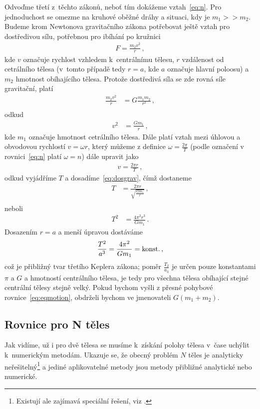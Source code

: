 \documentclass[A4paper, 12pt, oneside]{book}
\begin{document}
Odvoďme třetí z~těchto zákonů, neboť tím dokážeme vztah~\eqref{eq:n}. Pro jednoduchost se omezme na kruhové oběžné dráhy a situaci, kdy je $m_1>>m_2$. Budeme krom Newtonova gravitačního zákona potřebovat ještě vztah pro dostředivou sílu, potřebnou pro ibíhání po kružnici
\begin{align}
	F=\frac{m_2v^2}{r}\,,
\end{align}
kde $v$ označuje rychlost vzhledem k~centrálnímu tělesu, $r$ vzdálenost od cetrálního tělesa (v~tomto případě tedy $r=a$, kde $a$ označuje hlavní poloosu) a $m_2$ hmotnost obíhajícího tělesa. Protože dostředivá síla se zde rovná síle gravitační, platí
\begin{align}
	\nonumber \frac{m_2v^2}{r}&=G\frac{m_1m_2}{r^2}\,, \\
\end{align}
	odkud
\begin{align}
	v^2&=\frac{Gm_1}{r}\,, \label{eq:dosgrav}
\end{align}
kde $m_1$ označuje hmotnost cetrálního tělesa. Dále platí vztah mezi úhlovou a obvodovou rychlostí $v=\omega r$, který můžeme z definice $\omega=\frac{2\pi}{T}$ (podle označení v rovnici~\eqref{eq:n} platí $\omega=n$) dále upravit jako
\begin{align}
	v=\frac{2\pi r}{T}\,,
\end{align}
odkud vyjádříme $T$ a dosadíme~\eqref{eq:dosgrav}, čímž dostaneme
\begin{align}
	T&=\frac{2\pi r}{\sqrt{\frac{Gm_1}{r}}}\,, \\
	\end{align}
	neboli
	\begin{align}
	T^2&=\frac{4\pi^2 r^3}{Gm_1}\,.
\end{align}
Dosazením $r=a$ a menší úpravou dostáváme
\begin{align*}
	\frac{T^2}{a^3}=\frac{4\pi^2}{Gm_1}={\rm konst.}\,,
\end{align*}
což je přibližný tvar třetího Keplera zákona; poměr $\frac{T_2}{a_3}$ je určen pouze konstantami $\pi$ a $G$ a hmotností centrálního tělesa, je tedy pro všechna tělesa obíhající stejné centrální tělesy stejně velký. Pokud bychom vyšli z přesné pohybové rovnice~\ref{eq:eqmotion}, obdrželi bychom ve jmenovateli $G(m_1+m_2)$. 


\subsection{Rovnice pro N těles}
Jak vidíme, už i pro dvě tělesa se musíme k~získání polohy tělesa v~čase uchýlit k~numerickým metodám. Ukazuje se, že obecný problém $N$ těles je analyticky neřešitelný\footnote{Existují ale zajímavá speciální řešení, viz \cite{cohan12}.} a jediné aplikovatelné metody jsou metody přibližné analytické nebo numerické.
\end{document}
